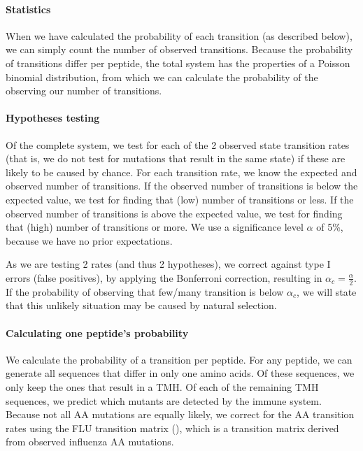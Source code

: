 \paragraph{Statistics}

When we have calculated the probability of each transition (as described below),
we can simply count the number of observed transitions.
Because the probability of transitions differ per peptide,
the total system has the properties of a Poisson binomial distribution,
from which we can calculate the probability of the observing our
number of transitions.

\paragraph{Hypotheses testing}

Of the complete system, we test for each of the 2 observed 
state transition rates (that is, we do not test for mutations that result in the same state)
if these are likely to be caused by chance.
For each transition rate, we know the expected and observed number
of transitions. If the observed number of transitions is below the expected
value, we test for finding that (low) number of transitions or less.
If the observed number of transitions is above the expected
value, we test for finding that (high) number of transitions or more.
We use a significance level $\alpha$ of 5\%, because we have no prior
expectations. 

As we are testing 2 rates (and thus 2 hypotheses), 
we correct against type I errors (false positives), 
by applying the Bonferroni correction, 
resulting in $\alpha_c = \frac{\alpha}{2}$.
If the probability of observing that few/many 
transition is below $\alpha_c$, we will state 
that this unlikely situation may be caused by natural selection.

\paragraph{Calculating one peptide's probability}

We calculate the probability of a transition per peptide.
For any peptide, we can generate all sequences that differ
in only one amino acids. Of these sequences, we only keep the ones
that result in a TMH. Of each of the remaining TMH sequences, we predict
which mutants are detected by the immune system. Because not all 
AA mutations are equally likely, we correct for the AA transition
rates using the FLU transition matrix (\cite{dang2010flu}),
which is a transition matrix derived from observed influenza AA mutations.

